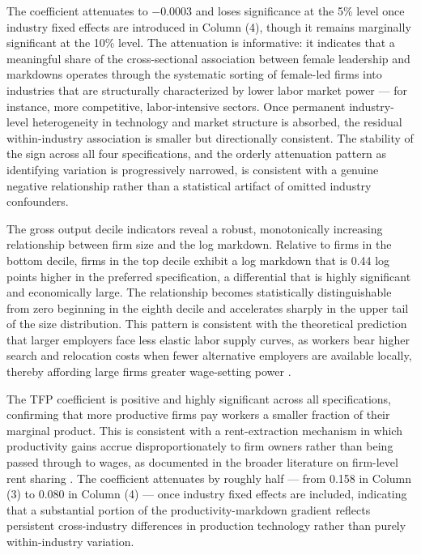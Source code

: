 \documentclass[12pt]{article}
\begin{document}
The coefficient attenuates to $-0.0003$ and loses significance at the 5\% level once industry fixed effects are introduced in Column (4), though it remains marginally significant at the 10\% level. The attenuation is informative: it indicates that a meaningful share of the cross-sectional association between female leadership and markdowns operates through the systematic sorting of female-led firms into industries that are structurally characterized by lower labor market power — for instance, more competitive, labor-intensive sectors. Once permanent industry-level heterogeneity in technology and market structure is absorbed, the residual within-industry association is smaller but directionally consistent. The stability of the sign across all four specifications, and the orderly attenuation pattern as identifying variation is progressively narrowed, is consistent with a genuine negative relationship rather than a statistical artifact of omitted industry confounders.

The gross output decile indicators reveal a robust, monotonically increasing relationship between firm size and the log markdown. Relative to firms in the bottom decile, firms in the top decile exhibit a log markdown that is 0.44 log points higher in the preferred specification, a differential that is highly significant and economically large. The relationship becomes statistically distinguishable from zero beginning in the eighth decile and accelerates sharply in the upper tail of the size distribution. This pattern is consistent with the theoretical prediction that larger employers face less elastic labor supply curves, as workers bear higher search and relocation costs when fewer alternative employers are available locally, thereby affording large firms greater wage-setting power \parencite{manning_elusive_2021, card_who_2022, yeh_monopsony_2022}.

The TFP coefficient is positive and highly significant across all specifications, confirming that more productive firms pay workers a smaller fraction of their marginal product. This is consistent with a rent-extraction mechanism in which productivity gains accrue disproportionately to firm owners rather than being passed through to wages, as documented in the broader literature on firm-level rent sharing \parencite{card_who_2022}. The coefficient attenuates by roughly half — from 0.158 in Column (3) to 0.080 in Column (4) — once industry fixed effects are included, indicating that a substantial portion of the productivity-markdown gradient reflects persistent cross-industry differences in production technology rather than purely within-industry variation.
\end{document}
